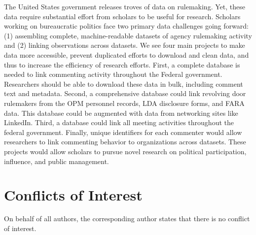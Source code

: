 \documentclass[
      12pt,
        ]{article}
\begin{document}
The United States government releases troves of data on rulemaking. Yet,
these data require substantial effort from scholars to be useful for
research. Scholars working on bureaucratic politics face two primary
data challenges going forward: (1) assembling complete, machine-readable
datasets of agency rulemaking activity and (2) linking observations
across datasets. We see four main projects to make data more accessible,
prevent duplicated efforts to download and clean data, and thus to
increase the efficiency of research efforts. First, a complete database
is needed to link commenting activity throughout the Federal government.
Researchers should be able to download these data in bulk, including
comment text and metadata. Second, a comprehensive database could link
revolving door rulemakers from the OPM personnel records, LDA disclosure
forms, and FARA data. This database could be augmented with data from
networking sites like LinkedIn. Third, a database could link all meeting
activities throughout the federal government. Finally, unique
identifiers for each commenter would allow researchers to link
commenting behavior to organizations across datasets. These projects
would allow scholars to pursue novel research on political
participation, influence, and public management.

\hypertarget{conflicts-of-interest}{%
\section{Conflicts of Interest}\label{conflicts-of-interest}}

On behalf of all authors, the corresponding author states that there is
no conflict of interest.
  \newpage 
  \theendnotes
\newpage
\singlespacing 
           
  
\end{document}

